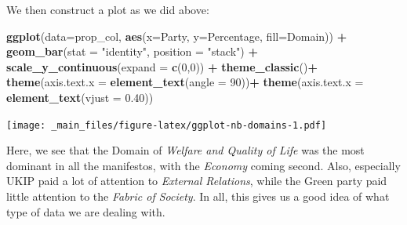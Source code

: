 \documentclass[
]{book}
\newenvironment{Shaded}{\begin{snugshade}}{\end{snugshade}}
\newcommand{\AttributeTok}[1]{\textcolor[rgb]{0.13,0.29,0.53}{#1}}
\newcommand{\DecValTok}[1]{\textcolor[rgb]{0.00,0.00,0.81}{#1}}
\newcommand{\FloatTok}[1]{\textcolor[rgb]{0.00,0.00,0.81}{#1}}
\newcommand{\FunctionTok}[1]{\textcolor[rgb]{0.13,0.29,0.53}{\textbf{#1}}}
\newcommand{\NormalTok}[1]{#1}
\newcommand{\OtherTok}[1]{\textcolor[rgb]{0.56,0.35,0.01}{#1}}
\newcommand{\SpecialCharTok}[1]{\textcolor[rgb]{0.81,0.36,0.00}{\textbf{#1}}}
\newcommand{\StringTok}[1]{\textcolor[rgb]{0.31,0.60,0.02}{#1}}
\begin{document}
\begin{Shaded}
\end{Shaded}

We then construct a plot as we did above:

\begin{Shaded}
\begin{Highlighting}[]
\FunctionTok{ggplot}\NormalTok{(}\AttributeTok{data=}\NormalTok{prop\_col, }\FunctionTok{aes}\NormalTok{(}\AttributeTok{x=}\NormalTok{Party, }\AttributeTok{y=}\NormalTok{Percentage, }\AttributeTok{fill=}\NormalTok{Domain)) }\SpecialCharTok{+}
 \FunctionTok{geom\_bar}\NormalTok{(}\AttributeTok{stat =} \StringTok{"identity"}\NormalTok{, }\AttributeTok{position =} \StringTok{"stack"}\NormalTok{) }\SpecialCharTok{+}
 \FunctionTok{scale\_y\_continuous}\NormalTok{(}\AttributeTok{expand =} \FunctionTok{c}\NormalTok{(}\DecValTok{0}\NormalTok{,}\DecValTok{0}\NormalTok{)) }\SpecialCharTok{+}
 \FunctionTok{theme\_classic}\NormalTok{()}\SpecialCharTok{+}
 \FunctionTok{theme}\NormalTok{(}\AttributeTok{axis.text.x =} \FunctionTok{element\_text}\NormalTok{(}\AttributeTok{angle =} \DecValTok{90}\NormalTok{))}\SpecialCharTok{+}
 \FunctionTok{theme}\NormalTok{(}\AttributeTok{axis.text.x =} \FunctionTok{element\_text}\NormalTok{(}\AttributeTok{vjust =} \FloatTok{0.40}\NormalTok{))}
\end{Highlighting}
\end{Shaded}

\texttt{[image: \_main\_files/figure-latex/ggplot-nb-domains-1.pdf]}

Here, we see that the Domain of \emph{Welfare and Quality of Life} was the most dominant in all the manifestos, with the \emph{Economy} coming second. Also, especially UKIP paid a lot of attention to \emph{External Relations}, while the Green party paid little attention to the \emph{Fabric of Society}. In all, this gives us a good idea of what type of data we are dealing with.
\end{document}
